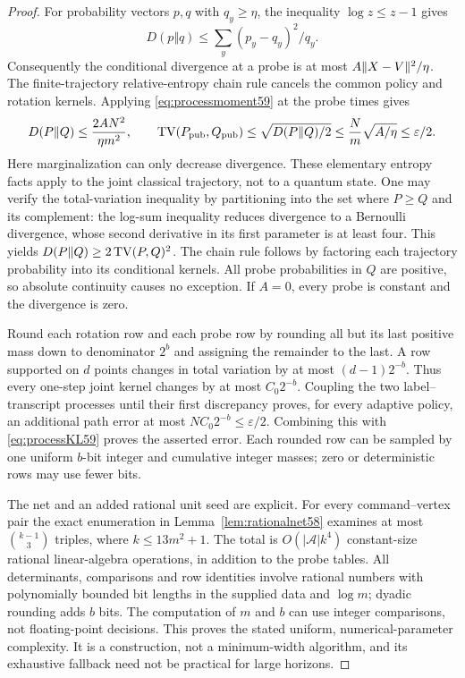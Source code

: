\begin{proof}
For probability vectors $p,q$ with $q_y\ge\eta$, the inequality
$\log z\le z-1$ gives
\[
 D(p\Vert q)\le\sum_y(p_y-q_y)^2/q_y.
\]
Consequently the conditional divergence at a probe is at most
$A\lVert X-V\rVert^2/\eta$. The finite-trajectory relative-entropy chain rule
cancels the common policy and rotation kernels. Applying
\eqref{eq:processmoment59} at the probe times gives
\begin{equation}\label{eq:processKL59}
 D(P\Vert Q)\le \frac{2AN^2}{\eta m^2},\qquad
 \operatorname{TV}(P_{\rm pub},Q_{\rm pub})
       \le\sqrt{D(P\Vert Q)/2}
       \le \frac Nm\sqrt{A/\eta}\le\varepsilon/2.
\end{equation}
Here marginalization can only decrease divergence. These elementary
entropy facts apply to the joint classical trajectory, not to a quantum
state. One may verify the total-variation inequality by partitioning
into the set where $P\ge Q$ and its complement: the log-sum inequality
reduces divergence to a Bernoulli divergence, whose second derivative
in its first parameter is at least four. This yields
$D(P\Vert Q)\ge2\operatorname{TV}(P,Q)^2$. The chain rule follows by factoring each
trajectory probability into its conditional kernels. All probe
probabilities in $Q$ are positive, so absolute continuity causes no
exception. If $A=0$, every probe is constant and the divergence is zero.

Round each rotation row and each probe row by rounding all but its last
positive mass down to denominator $2^b$ and assigning the remainder to
the last. A row supported on $d$ points changes in total variation by
at most $(d-1)2^{-b}$. Thus every one-step joint kernel changes by at most
$C_0 2^{-b}$. Coupling the two label--transcript processes until their
first discrepancy proves, for every adaptive policy, an additional
path error at most $NC_0 2^{-b}\le\varepsilon/2$. Combining this with
\eqref{eq:processKL59} proves the asserted error. Each rounded row can
be sampled by one uniform $b$-bit integer and cumulative integer masses;
zero or deterministic rows may use fewer bits.

The net and an added rational unit seed are explicit. For every
command--vertex pair the exact enumeration in
Lemma~\ref{lem:rationalnet58} examines at most $\binom{k-1}{3}$ triples,
where $k\le13m^2+1$. The total is $O(|\mathcal A|k^4)$ constant-size
rational linear-algebra operations, in addition to the probe tables.
All determinants, comparisons and row identities involve rational
numbers with polynomially bounded bit lengths in the supplied data and
$\log m$; dyadic rounding adds $b$ bits. The computation of $m$ and $b$
can use integer comparisons, not floating-point decisions. This proves
the stated uniform, numerical-parameter complexity. It is a construction,
not a minimum-width algorithm, and its exhaustive fallback need not be
practical for large horizons.
\end{proof}

